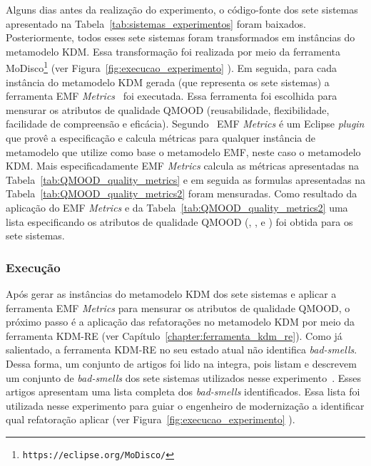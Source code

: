 Alguns dias antes da realização do experimento, o código-fonte dos sete sistemas apresentado na Tabela~\ref{tab:sistemas_experimentos} foram baixados. Posteriormente, todos esses sete sistemas foram transformados em instâncias do metamodelo KDM. Essa transformação foi realizada por meio da ferramenta MoDisco\footnote{\texttt{https://eclipse.org/MoDisco/}} (ver Figura~\ref{fig:execucao_experimento} ). Em seguida, para cada instância do metamodelo KDM gerada (que representa os sete sistemas) a ferramenta EMF \textit{Metrics}~\cite{Arendt_2012, Thorsten_2010_durelli} foi executada. Essa ferramenta foi escolhida para mensurar os atributos de qualidade QMOOD (reusabilidade, flexibilidade, facilidade de compreensão e eficácia). Segundo~ EMF \textit{Metrics} é um Eclipse \textit{plugin} que provê a especificação e calcula métricas para qualquer instância de metamodelo que utilize como base o metamodelo EMF, neste caso o metamodelo KDM. Mais especificadamente EMF \textit{Metrics} calcula as métricas apresentadas na Tabela~\ref{tab:QMOOD_quality_metrics} e em seguida as formulas apresentadas na Tabela~\ref{tab:QMOOD_quality_metrics2} foram mensuradas. Como resultado da aplicação do EMF \textit{Metrics} e da Tabela~\ref{tab:QMOOD_quality_metrics2} uma lista especificando os atributos de qualidade QMOOD (, ,  e ) foi obtida para os sete sistemas.

\subsubsection{Execução}

Após gerar as instâncias do metamodelo KDM dos sete sistemas e aplicar a ferramenta EMF \textit{Metrics} para mensurar os atributos de qualidade QMOOD, o próximo passo é a aplicação das refatorações no metamodelo KDM por meio da ferramenta KDM-RE (ver Capítulo~\ref{chapter:ferramenta_kdm_re}). Como já salientado, a ferramenta KDM-RE no seu estado atual não identifica \textit{bad-smells}. Dessa forma, um conjunto de artigos foi lido na integra, pois listam e descrevem um conjunto de \textit{bad-smells} dos sete sistemas utilizados nesse experimento~\cite{Kessentini_2011, Ouni_2013, Moha_2010, Kessentini_2010}. Esses artigos apresentam uma lista completa dos \textit{bad-smells} identificados. Essa lista foi utilizada nesse experimento para guiar o engenheiro de modernização a identificar qual refatoração aplicar (ver Figura~\ref{fig:execucao_experimento} ).

